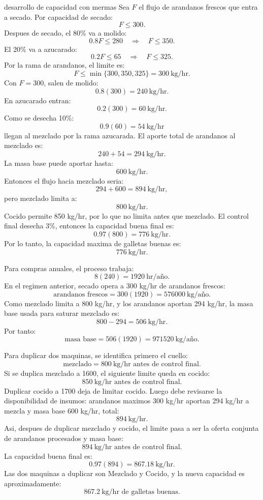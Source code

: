\begin{pautacompleta}{desarrollo de capacidad con mermas}
Sea $F$ el flujo de arandanos frescos que entra a secado. Por capacidad de secado:
\[
  F\leq 300.
\]
Despues de secado, el 80\% va a molido:
\[
  0.8F\leq 280
  \quad\Rightarrow\quad
  F\leq 350.
\]
El 20\% va a azucarado:
\[
  0.2F\leq 65
  \quad\Rightarrow\quad
  F\leq 325.
\]
Por la rama de arandanos, el limite es:
\[
  F\leq \min\{300,350,325\}=300\ \text{kg/hr}.
\]
Con $F=300$, salen de molido:
\[
  0.8(300)=240\ \text{kg/hr}.
\]
En azucarado entran:
\[
  0.2(300)=60\ \text{kg/hr}.
\]
Como se desecha 10\%:
\[
  0.9(60)=54\ \text{kg/hr}
\]
llegan al mezclado por la rama azucarada. El aporte total de arandanos al mezclado es:
\[
  240+54=294\ \text{kg/hr}.
\]
La masa base puede aportar hasta:
\[
  600\ \text{kg/hr}.
\]
Entonces el flujo hacia mezclado seria:
\[
  294+600=894\ \text{kg/hr},
\]
pero mezclado limita a:
\[
  800\ \text{kg/hr}.
\]
Cocido permite 850 kg/hr, por lo que no limita antes que mezclado. El control final desecha 3\%, entonces la capacidad buena final es:
\[
  0.97(800)=776\ \text{kg/hr}.
\]
Por lo tanto, la capacidad maxima de galletas buenas es:
\[
  776\ \text{kg/hr}.
\]

Para compras anuales, el proceso trabaja:
\[
  8(240)=1920\ \text{hr/año}.
\]
En el regimen anterior, secado opera a 300 kg/hr de arandanos frescos:
\[
  \text{arandanos frescos}=300(1920)=576000\ \text{kg/año}.
\]
Como mezclado limita a 800 kg/hr, y los arandanos aportan 294 kg/hr, la masa base usada para saturar mezclado es:
\[
  800-294=506\ \text{kg/hr}.
\]
Por tanto:
\[
  \text{masa base}=506(1920)=971520\ \text{kg/año}.
\]

Para duplicar dos maquinas, se identifica primero el cuello:
\[
  \text{mezclado}=800\ \text{kg/hr antes de control final}.
\]
Si se duplica mezclado a 1600, el siguiente limite queda en cocido:
\[
  850\ \text{kg/hr antes de control final}.
\]
Duplicar cocido a 1700 deja de limitar cocido. Luego debe revisarse la disponibilidad de insumos: arandanos maximos 300 kg/hr aportan 294 kg/hr a mezcla y masa base 600 kg/hr, total:
\[
  894\ \text{kg/hr}.
\]
Asi, despues de duplicar mezclado y cocido, el limite pasa a ser la oferta conjunta de arandanos procesados y masa base:
\[
  894\ \text{kg/hr antes de control final}.
\]
La capacidad buena final es:
\[
  0.97(894)=867.18\ \text{kg/hr}.
\]
Las dos maquinas a duplicar son Mezclado y Cocido, y la nueva capacidad es aproximadamente:
\[
  867.2\ \text{kg/hr de galletas buenas}.
\]
\end{pautacompleta}
